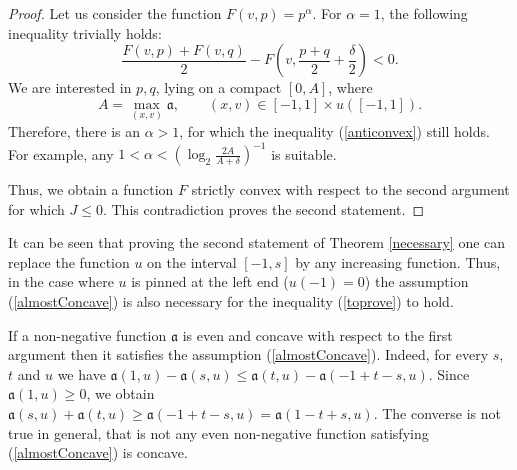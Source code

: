 \begin{proof}
Let us consider the function $F(v, p) = p ^ \alpha$.
For $\alpha = 1$, the following inequality trivially holds:
\begin{equation}
\label{anticonvex}
\frac{F(v, p) + F(v, q)}{ 2 } - F(v, \frac{p + q}{ 2 } + \frac{\delta}{ 2}) <0.
\end{equation}
We are interested in $p, q$, lying on a compact $[0 , A]$,
where 
$$A=\max \limits_{(x, v)} \mathfrak a,\qquad (x, v) \in [-1, 1 ] \times u([-1, 1] ).
$$
Therefore, there is an $\alpha> 1$, for which the inequality (\ref{anticonvex})
still holds.
For example, any $1 < \alpha < (\log_2 \frac{ 2 A}{A + \delta})^{-1}$ is suitable.

Thus, we obtain a function $F$ strictly convex with respect to the second argument
for which $J \le 0$. This contradiction proves the second statement.
\end{proof}

\begin{rem}
\label{landesNecessary}
It can be seen that proving the second statement of Theorem \ref{necessary}
one can replace the function $u$ on the interval $[-1, s]$ by any increasing function.
Thus, in the case where $u$ is pinned at the left end {\rm ($u(-1) = 0$)}
the assumption (\ref{almostConcave}) is also necessary for the inequality (\ref{toprove}) to hold.
\end{rem}

\begin{rem}
If a  non-negative function $\mathfrak a$ is even and concave with respect to the first argument then it satisfies the assumption (\ref{almostConcave}). 
Indeed, for every $s$, $t$ and $u$ we have $\mathfrak a( 1 , u) - \mathfrak a(s, u) \le \mathfrak a(t, u) - \mathfrak a(-1 + t - s, u)$.
Since $\mathfrak a(1 , u) \ge 0$, we obtain $\mathfrak a(s, u) + \mathfrak a(t, u) \ge \mathfrak a(-1 + t - s, u) = \mathfrak a( 1 - t + s, u)$.
The converse is not true in general, that is not any even
non-negative function satisfying (\ref{almostConcave}) is concave.
\end{rem}
